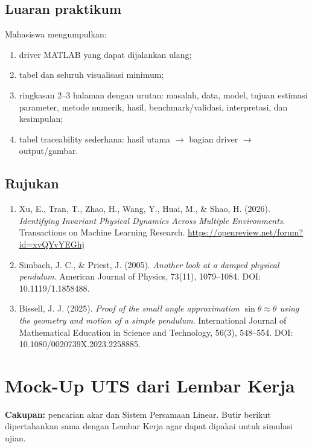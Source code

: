 \documentclass[book,english,noindex,lean,nobackpage,nocopyright,noupdate,nofiglist,notablist]{enacom}
\begin{document}
\section{Luaran praktikum}
Mahasiswa mengumpulkan:
\begin{enumerate}
\item driver MATLAB yang dapat dijalankan ulang;
\item tabel dan seluruh visualisasi minimum;
\item ringkasan 2--3 halaman dengan urutan: masalah, data, model, tujuan estimasi parameter, metode numerik, hasil, benchmark/validasi, interpretasi, dan kesimpulan;
\item tabel traceability sederhana: hasil utama $\rightarrow$ bagian driver $\rightarrow$ output/gambar.
\end{enumerate}

\section*{Rujukan}
\begin{enumerate}
\item Xu, E., Tran, T., Zhao, H., Wang, Y., Huai, M., \& Shao, H. (2026). \textit{Identifying Invariant Physical Dynamics Across Multiple Environments}. Transactions on Machine Learning Research. \url{https://openreview.net/forum?id=xvQYvYEGhj}
\item Simbach, J. C., \& Priest, J. (2005). \textit{Another look at a damped physical pendulum}. American Journal of Physics, 73(11), 1079--1084. DOI: 10.1119/1.1858488.
\item Bissell, J. J. (2025). \textit{Proof of the small angle approximation $\sin\theta\approx\theta$ using the geometry and motion of a simple pendulum}. International Journal of Mathematical Education in Science and Technology, 56(3), 548--554. DOI: 10.1080/0020739X.2023.2258885.
\end{enumerate}


\chapter*{Mock-Up UTS dari Lembar Kerja}
\noindent\textbf{Cakupan:} pencarian akar dan Sistem Persamaan Linear. Butir berikut dipertahankan sama dengan Lembar Kerja agar dapat dipakai untuk simulasi ujian.
\end{document}
